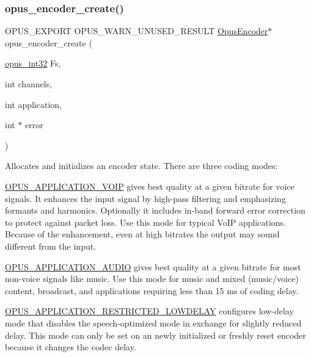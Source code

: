 \subsubsection{\texorpdfstring{opus\_encoder\_create()}{opus\_encoder\_create()}}
{\footnotesize\ttfamily O\+P\+U\+S\+\_\+\+E\+X\+P\+O\+RT O\+P\+U\+S\+\_\+\+W\+A\+R\+N\+\_\+\+U\+N\+U\+S\+E\+D\+\_\+\+R\+E\+S\+U\+LT \mbox{\hyperlink{group__opus__encoder_gaf461a3ef2f10c2fe8b994a176f06c9bd}{Opus\+Encoder}}$\ast$ opus\+\_\+encoder\+\_\+create (\begin{DoxyParamCaption}\item[{\mbox{\hyperlink{opus__types_8h_aa4d309d6f80b99dbabebc8f98879ab9a}{opus\+\_\+int32}}}]{Fs,  }\item[{int}]{channels,  }\item[{int}]{application,  }\item[{int $\ast$}]{error }\end{DoxyParamCaption})}

Allocates and initializes an encoder state. There are three coding modes\+:

\mbox{\hyperlink{group__opus__ctlvalues_ga07884aa018303a419d1f7acb2f3fa669}{O\+P\+U\+S\+\_\+\+A\+P\+P\+L\+I\+C\+A\+T\+I\+O\+N\+\_\+\+V\+O\+IP}} gives best quality at a given bitrate for voice signals. It enhances the input signal by high-\/pass filtering and emphasizing formants and harmonics. Optionally it includes in-\/band forward error correction to protect against packet loss. Use this mode for typical Vo\+IP applications. Because of the enhancement, even at high bitrates the output may sound different from the input.

\mbox{\hyperlink{group__opus__ctlvalues_ga5909f7cb35c04f1110026c6889edd345}{O\+P\+U\+S\+\_\+\+A\+P\+P\+L\+I\+C\+A\+T\+I\+O\+N\+\_\+\+A\+U\+D\+IO}} gives best quality at a given bitrate for most non-\/voice signals like music. Use this mode for music and mixed (music/voice) content, broadcast, and applications requiring less than 15 ms of coding delay.

\mbox{\hyperlink{group__opus__ctlvalues_ga592232fb39db60c1369989c5c5d19a07}{O\+P\+U\+S\+\_\+\+A\+P\+P\+L\+I\+C\+A\+T\+I\+O\+N\+\_\+\+R\+E\+S\+T\+R\+I\+C\+T\+E\+D\+\_\+\+L\+O\+W\+D\+E\+L\+AY}} configures low-\/delay mode that disables the speech-\/optimized mode in exchange for slightly reduced delay. This mode can only be set on an newly initialized or freshly reset encoder because it changes the codec delay.

